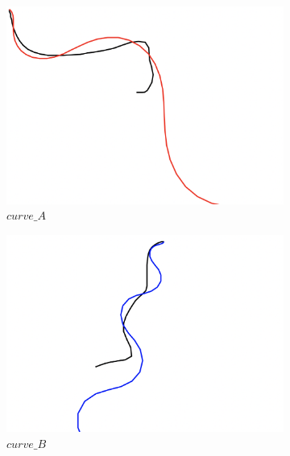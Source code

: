 \begin{figure}[H]
     \centering
     \begin{subfigure}[b]{0.31\textwidth}
         \centering
         \includegraphics[width=\textwidth]{images/ddpg_results/envs_S3_S4_S5/S4_A2_R3_curve_A.png}
         \caption{$curve\_A$}
     \end{subfigure}
     \hfill
     \begin{subfigure}[b]{0.31\textwidth}
         \centering
         \includegraphics[width=\textwidth]{images/ddpg_results/envs_S3_S4_S5/S4_A2_R3_curve_B.png}
         \caption{$curve\_B$}
     \end{subfigure}
     \hfill
     \begin{subfigure}[b]{0.31\textwidth}
         \centering

\end{subfigure}
\end{figure}
